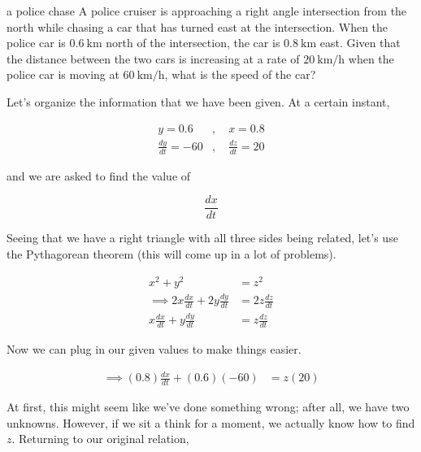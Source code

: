 \begin{examplebreak}{a police chase}
    A police cruiser is approaching a right angle intersection from the north while chasing a car that has turned east at the intersection. When the police car is \( \SI{0.6}{\kilo\meter} \) north of the intersection, the car is \( \SI{0.8}{\kilo\meter} \) east. Given that the distance between the two cars is increasing at a rate of \( \SI{20}{\kilo\meter\per\hour} \) when the police car is moving at \( \SI{60}{\kilo\meter\per\hour} \), what is the speed of the car?

    \begin{figure}[H]
        \centering
        
    \end{figure}

    \vspace{0.3cm}

    Let's organize the information that we have been given. At a certain instant,

    \begin{align*}
        y = 0.6 &, \quad x = 0.8 \\
        \frac{dy}{dt} = -60 &, \quad \frac{dz}{dt} = 20 
    \end{align*}

    and we are asked to find the value of

    \[
        \frac{dx}{dt}
    \]

    Seeing that we have a right triangle with all three sides being related, let's use the Pythagorean theorem (this will come up in a lot of problems).

    \begin{align*}
        x^2 + y^2 &= z^2 \\
        \implies 2x\frac{dx}{dt} + 2y\frac{dy}{dt} &= 2z\frac{dz}{dt} \\
        x\frac{dx}{dt} + y\frac{dy}{dt} &= z\frac{dz}{dt}
    \end{align*}

    Now we can plug in our given values to make things easier.

    \begin{align*}
        \implies \left( 0.8 \right) \frac{dx}{dt} + \left( 0.6 \right) \left( -60 \right) &= z \left( 20 \right)
    \end{align*}

    At first, this might seem like we've done something wrong; after all, we have two unknowns. However, if we sit a think for a moment, we actually know how to find \( z \). Returning to our original relation,


\end{examplebreak}
